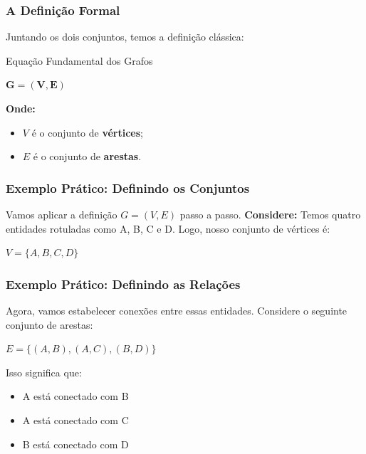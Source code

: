 \documentclass[9pt]{beamer}
\begin{document}
\begin{frame}
    \frametitle{A Definição Formal}
    Juntando os dois conjuntos, temos a definição clássica:
    \vspace{0.8cm}
    \begin{block}{Equação Fundamental dos Grafos}
        \begin{center}
            \Huge $\mathbf{G = (V, E)}$
        \end{center}
    \end{block}
    \vspace{0.5cm}
    \begin{center}
        \Large \textbf{Onde:}
    \end{center}
    \begin{itemize}
        \item \textbf{$V$} é o conjunto de \textbf{vértices};
        \item \textbf{$E$} é o conjunto de \textbf{arestas}.
    \end{itemize}
\end{frame}

\begin{frame}
    \frametitle{Exemplo Prático: Definindo os Conjuntos}
    Vamos aplicar a definição $G = (V,E)$ passo a passo.
    \vspace{0.5cm}
    \textbf{Considere:}
    Temos quatro entidades rotuladas como A, B, C e D.
    \vspace{0.5cm}
    Logo, nosso conjunto de vértices é:
    \begin{center}
        \Large $V = \{A, B, C, D\}$
    \end{center}
\end{frame}

\begin{frame}
    \frametitle{Exemplo Prático: Definindo as Relações}
    Agora, vamos estabelecer conexões entre essas entidades. Considere o seguinte conjunto de arestas:
    \vspace{0.5cm}
    \begin{center}
        \Large $E = \{(A, B), (A, C), (B, D)\}$
    \end{center}
    \vspace{0.5cm}
    Isso significa que:
    \begin{itemize}
        \item A está conectado com B
        \item A está conectado com C
        \item B está conectado com D
    \end{itemize}
\end{frame}
\end{document}
